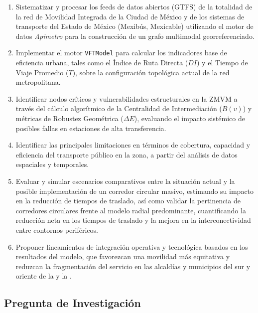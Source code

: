 \begin{enumerate}
    \item Sistematizar y procesar los feeds de datos abiertos (GTFS) de la totalidad 
    de la red de Movilidad Integrada de la Ciudad de México y de los sistemas 
    de transporte del Estado de México (Mexibús, Mexicable) 
    utilizando el motor de datos \textit{Apimetro} \textcite{cabrera2025apimetro} 
    para la construcción de un grafo multimodal georreferenciado.

    \item Implementar el motor \texttt{VFTModel} para calcular los indicadores base de eficiencia urbana, 
    tales como el Índice de Ruta Directa ($DI$) y el Tiempo de Viaje Promedio ($T$), 
    sobre la configuración topológica actual de la red metropolitana.

    \item Identificar nodos críticos y vulnerabilidades estructurales en la ZMVM a través del cálculo 
    algorítmico de la Centralidad de Intermediación ($B(v)$) y métricas de Robustez Geométrica ($\Delta E$), 
    evaluando el impacto sistémico de posibles fallas en estaciones de alta transferencia.

    \item Identificar las principales limitaciones en términos de cobertura, capacidad y
    eficiencia del transporte público en la zona, a partir del análisis de datos
    espaciales y temporales.

    \item Evaluar y simular escenarios comparativos entre la situación actual y la posible
    implementación de un corredor circular masivo, estimando su impacto en la
    reducción de tiempos de traslado, así como validar la pertinencia de corredores circulares 
    frente al modelo radial predominante, cuantificando la reducción neta en los tiempos de 
    traslado y la mejora en la interconectividad entre contornos periféricos.

    \item Proponer lineamientos de integración operativa y tecnológica basados en los resultados del modelo, 
    que favorezcan una movilidad más equitativa y reduzcan la fragmentación del servicio en las alcaldías y 
    municipios del sur y oriente de la \cdmx y la \zmvm.

\end{enumerate}

\subsection{Pregunta de Investigación}
\label{subsec:pregunta}

